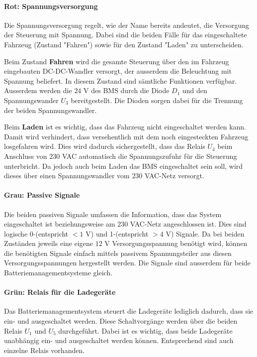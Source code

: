 \paragraph{Rot: Spannungsversorgung}
Die Spannungsversorgung regelt, wie der Name bereits andeutet, die Versorgung der Steuerung mit Spannung. Dabei sind die beiden Fälle für das eingeschaltete Fahrzeug (Zustand "Fahren") sowie für den Zustand "Laden" zu unterscheiden.

Beim Zustand \textbf{Fahren} wird die gesamte Steuerung über den im Fahrzeug eingebauten DC-DC-Wandler versorgt, der ausserdem die Beleuchtung mit Spannung beliefert. In diesem Zustand sind sämtliche Funktionen verfügbar. Ausserdem werden die $24$ V des BMS durch die Diode $D_1$ und den Spannungswander $U_3$ bereitgestellt. Die Dioden sorgen dabei für die Trennung der beiden Spannungswandler.

Beim \textbf{Laden} ist es wichtig, dass das Fahrzeug nicht eingeschaltet werden kann. Damit wird verhindert, dass versehentlich mit dem noch eingesteckten Fahrzeug losgefahren wird. Dies wird dadurch sichergestellt, dass das Relais $U_4$ beim Anschluss von $230$ VAC automatisch die Spannungszufuhr für die Steuerung unterbricht. Da jedoch auch beim Laden das BMS eingeschaltet sein soll, wird dieses über einen Spannungswandler vom $230$ VAC-Netz versorgt.

\paragraph{Grau: Passive Signale}
Die beiden passiven Signale umfassen die Information, dass das System eingeschaltet ist beziehungsweise am $230$ VAC-Netz angeschlossen ist. Dies sind logische 0-(entspricht $<1$ V) und 1-(entspricht $>4$ V) Signale. Da bei beiden Zuständen jeweils eine eigene $12$ V Versorgungsspannung benötigt wird, können die benötigten Signale einfach mittels passivem Spannungsteiler aus diesen Versorgungsspannungen hergestellt werden. Die Signale sind ausserdem für beide Batteriemanagementsysteme gleich.

\paragraph{Grün: Relais für die Ladegeräte}
Das Batteriemanagementsystem steuert die Ladegeräte lediglich dadurch, dass sie ein- und ausgeschaltet werden. Diese Schaltvorgänge werden über die beiden Relais $U_1$ und $U_5$ durchgeführt. Dabei ist es wichtig, dass beide Ladegeräte unabhängig ein- und ausgeschaltet werden können. Entsprechend sind auch einzelne Relais vorhanden.

